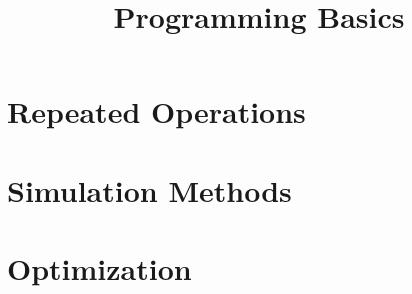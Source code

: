 

\title{Programming Basics}

\date[]{}



\frame{\titlepage}

\frame{\tableofcontents}

\section{Repeated Operations}
\frame{\tableofcontents[currentsection]}





\section{Simulation Methods}
\frame{\tableofcontents[currentsection]}



\section{Optimization}
\frame{\tableofcontents[currentsection]}





\appendix
\frame{}


